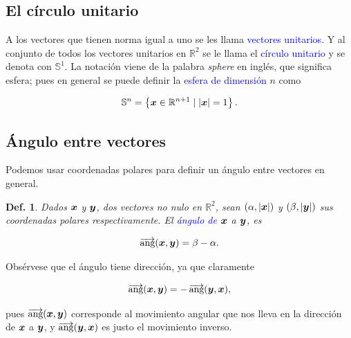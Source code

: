 \documentclass{article}
\theoremstyle{definicion}
\newtheorem{definicion}{Def.}
\theoremstyle{definition}             %
\theoremstyle{definition}             %
\theoremstyle{definition}
\theoremstyle{definition}
\theoremstyle{observacion}
\theoremstyle{definition}
\theoremstyle{plain}
\theoremstyle{definition}
\theoremstyle{afirmacion}
\theoremstyle{notation}
\theoremstyle{definition}
\DeclareMathOperator*{\ang}{\overrightarrow{\textrm{ang}}}
\begin{document}
        \subsection{El círculo unitario}

        A los vectores que tienen norma igual a uno se les llama \textcolor{blue}{vectores unitarios}. Y al conjunto de todos los vectores unitarios en \(\mathbb{R}^{2}\) se le llama el \textcolor{blue}{círculo unitario} y se denota con \(\mathbb{S}^{1}\). La notación viene de la palabra \emph{sphere} en inglés, que significa esfera; pues en general se puede definir la \textcolor{blue}{esfera de dimensión} \(n\) como

        \begin{equation*}
            \mathbb{S}^{n} = \left\lbrace \vb*{x} \in \mathbb{R}^{n + 1} \mid \abs{\vb*{x}} = 1 \right\rbrace.
        \end{equation*}

        \subsection{Ángulo entre vectores}

        Podemos usar coordenadas polares para definir un ángulo entre vectores en general.

        \begin{definicion}
            Dados \(\vb*{x}\) y \(\vb*{y}\), dos vectores no nulo en \(\mathbb{R}^{2}\), sean \((\alpha, \abs{\vb*{x}})\) y \((\beta, \abs{\vb*{y}})\) sus coordenadas polares respectivamente. El \textcolor{blue}{ángulo de} \(\vb*{x}\) a \(\vb*{y}\), es

            \begin{equation*}
                \ang(\vb*{x}, \vb*{y}) = \beta - \alpha.
            \end{equation*}
        \end{definicion}

        Obsérvese que el ángulo tiene dirección, ya que claramente

        \begin{equation*}
            \ang(\vb*{x}, \vb*{y}) = - \ang(\vb*{y}, \vb*{x}),
        \end{equation*}

        pues \(\ang(\vb*{x}, \vb*{y})\) corresponde al movimiento angular que nos lleva en la dirección de \(\vb*{x}\) a \(\vb*{y}\), y \(\ang(\vb*{y}, \vb*{x})\) es justo el movimiento inverso.
\end{document}

